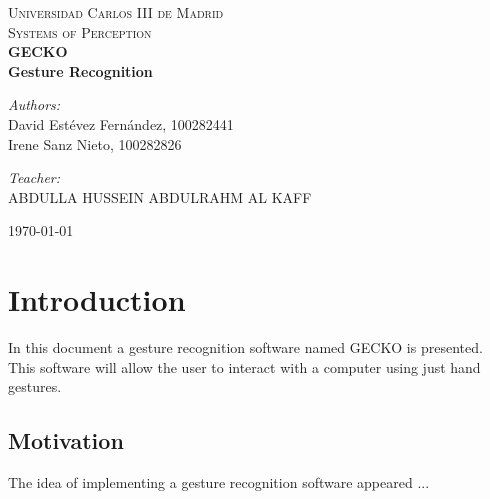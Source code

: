 \documentclass{article}
\begin{document}
\begin{titlepage}

\begin{center}
\textsc{\LARGE Universidad Carlos III de Madrid}\\[0.5cm]
\textsc{\Large Systems of Perception}\\[4cm]


{\Huge \bfseries{GECKO\\[1cm] Gesture Recognition}\\[8cm]}


\begin{minipage}{0.55\textwidth}
\begin{flushleft} \large
\emph{Authors:}\\
David Estévez Fernández, 100282441\\
Irene Sanz Nieto, 100282826\\
\end{flushleft}
\end{minipage}
\begin{minipage}{0.4\textwidth}
\begin{flushright} \large
\emph{Teacher:}\\
ABDULLA HUSSEIN ABDULRAHM AL KAFF
\end{flushright}\end{minipage}\vfill

{\large \today}

\end{center}
\end{titlepage}

%
\newpage
%
\tableofcontents
\newpage

\section{Introduction}
In this document a gesture recognition software named GECKO is presented. This software will allow the user to interact with a computer using just hand gestures. 

\subsection{Motivation}
The idea of implementing a gesture recognition software appeared ...
\end{document}
